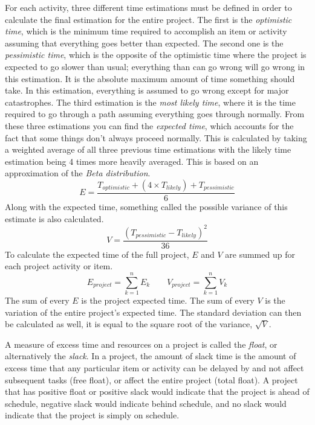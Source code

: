 \documentclass[12pt]{article}
\begin{document}
For each activity, three different time estimations must be defined in order to calculate the final estimation for the entire project.
The first is the \textit{optimistic time}, which is the minimum time required to accomplish an item or activity assuming that everything goes better than expected.
The second one is the \textit{pessimistic time}, which is the opposite of the optimistic time where the project is expected to go slower than usual; everything than can go wrong will go wrong in this estimation.  It is the absolute maximum amount of time something should take.
In this estimation, everything is assumed to go wrong except for major catastrophes.
The third estimation is the \textit{most likely time}, where it is the time required to go through a path assuming everything goes through normally.
From these three estimations you can find the \textit{expected time}, which accounts for the fact that some things don't always proceed normally.
This is calculated by taking a weighted average of all three previous time estimations with the likely time estimation being 4 times more heavily averaged.  This is based on an approximation of the \textit{Beta distribution}.
\[ E = \frac{T_{optimistic} + \left( 4 \times T_{likely} \right) + T_{pessimistic}}{6} \]
Along with the expected time, something called the possible variance of this estimate is also calculated.
\[ V = \frac{\left(T_{pessimistic}-T_{likely}\right)^2}{36} \]
To calculate the expected time of the full project, $E$ and $V$ are summed up for each project activity or item.
\[E_{project}=\sum_{k=1}^nE_k \quad\quad V_{project}=\sum_{k=1}^nV_k\]
The sum of every $E$ is the project expected time.  The sum of every $V$ is the variation of the entire project's expected time.  The standard deviation can then be calculated as well, it is equal to the square root of the variance, $\sqrt{V}$.

A measure of excess time and resources on a project is called the \textit{float}, or alternatively the \textit{slack}.  In a project, the amount of slack time is the amount of excess time that any particular item or activity can be delayed by and not affect subsequent tasks (free float), or affect the entire project (total float).  A project that has positive float or positive slack would indicate that the project is ahead of schedule, negative slack would indicate behind schedule, and no slack would indicate that the project is simply on schedule.
\end{document}
